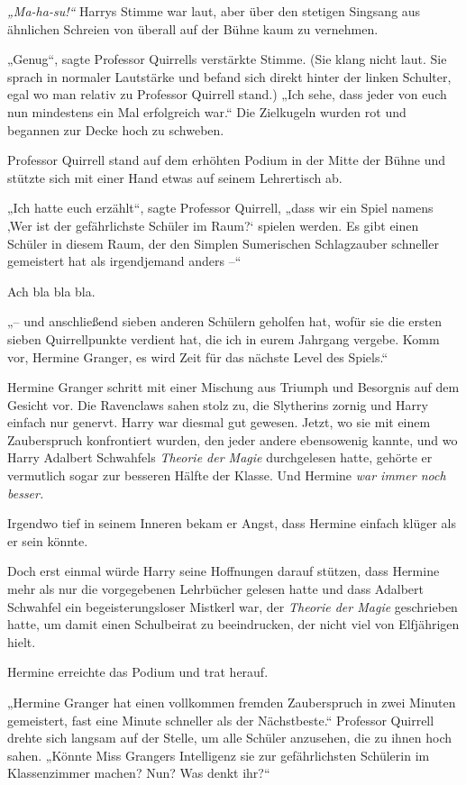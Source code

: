 {\emph{„Ma-ha-su!“} Harrys Stimme war laut, aber über den stetigen Singsang aus ähnlichen Schreien von überall auf der Bühne kaum zu vernehmen.

„Genug“, sagte Professor Quirrells verstärkte Stimme. (Sie klang nicht laut. Sie sprach in normaler Lautstärke und befand sich direkt hinter der linken Schulter, egal wo man relativ zu Professor Quirrell stand.) „Ich sehe, dass jeder von euch nun mindestens ein Mal erfolgreich war.“ Die Zielkugeln wurden rot und begannen zur Decke hoch zu schweben.

Professor Quirrell stand auf dem erhöhten Podium in der Mitte der Bühne und stützte sich mit einer Hand etwas auf seinem Lehrertisch ab.

„Ich hatte euch erzählt“, sagte Professor Quirrell, „dass wir ein Spiel namens ‚Wer ist der gefährlichste Schüler im Raum?` spielen werden. Es gibt einen Schüler in diesem Raum, der den Simplen Sumerischen Schlagzauber schneller gemeistert hat als irgendjemand anders --“

Ach bla bla bla.

„-- und anschließend sieben anderen Schülern geholfen hat, wofür sie die ersten sieben Quirrellpunkte verdient hat, die ich in eurem Jahrgang vergebe. Komm vor, Hermine Granger, es wird Zeit für das nächste Level des Spiels.“

Hermine Granger schritt mit einer Mischung aus Triumph und Besorgnis auf dem Gesicht vor. Die Ravenclaws sahen stolz zu, die Slytherins zornig und Harry einfach nur genervt. Harry war diesmal gut gewesen. Jetzt, wo sie mit einem Zauberspruch konfrontiert wurden, den jeder andere ebensowenig kannte, und wo Harry Adalbert Schwahfels \emph{Theorie der Magie} durchgelesen hatte, gehörte er vermutlich sogar zur besseren Hälfte der Klasse. Und Hermine \emph{war immer noch besser.}

Irgendwo tief in seinem Inneren bekam er Angst, dass Hermine einfach klüger als er sein könnte.

Doch erst einmal würde Harry seine Hoffnungen darauf stützen, dass Hermine mehr als nur die vorgegebenen Lehrbücher gelesen hatte und dass Adalbert Schwahfel ein begeisterungsloser Mistkerl war, der \emph{Theorie der Magie} geschrieben hatte, um damit einen Schulbeirat zu beeindrucken, der nicht viel von Elfjährigen hielt.

Hermine erreichte das Podium und trat herauf.

„Hermine Granger hat einen vollkommen fremden Zauberspruch in zwei Minuten gemeistert, fast eine Minute schneller als der Nächstbeste.“ Professor Quirrell drehte sich langsam auf der Stelle, um alle Schüler anzusehen, die zu ihnen hoch sahen. „Könnte Miss Grangers Intelligenz sie zur gefährlichsten Schülerin im Klassenzimmer machen? Nun? Was denkt ihr?“

}
